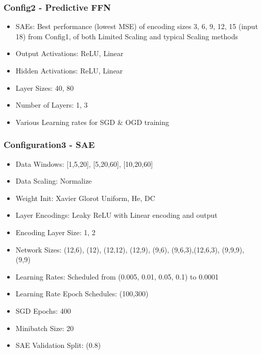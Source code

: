 \documentclass[a4paper,11pt,oneside]{article}
\theoremstyle{plain}
\theoremstyle{definition}
\begin{document}
\subsubsection{Config2 - Predictive FFN}\label{config2}

\begin{itemize}
	\item SAEs: Best performance (lowest MSE) of encoding sizes 3, 6, 9, 12, 15 (input 18) from Config1, of both Limited Scaling and typical Scaling methods
	\item Output Activations: ReLU, Linear
	\item Hidden Activations: ReLU, Linear
	\item Layer Sizes: 40, 80
	\item Number of Layers: 1, 3
	\item Various Learning rates for SGD \& OGD training
\end{itemize}

\subsubsection{Configuration3 - SAE}\label{config3}
\begin{itemize}
	\item Data Windows: [1,5,20], [5,20,60], [10,20,60]
	\item Data Scaling: Normalize
	\item Weight Init: Xavier Glorot Uniform, He, DC
	\item Layer Encodings: Leaky ReLU with Linear encoding and output
	\item Encoding Layer Size: 1, 2
	\item Network Sizes: (12,6), (12), (12,12), (12,9), (9,6), (9,6,3),(12,6,3), (9,9,9), (9,9)
	\item Learning Rates: Scheduled from (0.005, 0.01, 0.05, 0.1) to 0.0001
	\item Learning Rate Epoch Schedules: (100,300)
	\item SGD Epochs: 400
	\item Minibatch Size: 20
	\item SAE Validation Split: (0.8)
\end{itemize}
	
\end{document}

